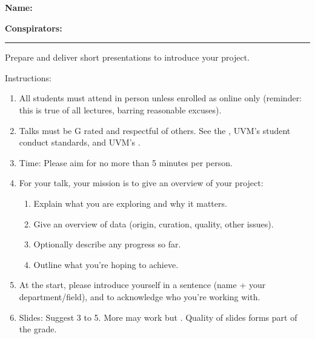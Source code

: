 \textbf{Name:} \\

\medskip

\textbf{Conspirators:} 

\medskip
\medskip

\hrule

\medskip


\assignmentsonly{\pleasesubmitprojectdraft}

Prepare and deliver short presentations to introduce your project.

Instructions:

\begin{enumerate}
\item 
  All students must attend in person unless enrolled as online only
  (reminder: this is true of all lectures, barring reasonable excuses).
  
\item 
  Talks must be G rated and respectful of others.
  See the
  ,
  UVM's student conduct standards,
  and UVM's
  .

\item
  Time: Please aim for no more than 5 minutes per person.

\item
  For your talk, your mission is to
  give an overview of your project:
  \begin{enumerate}
  \item
    Explain what you are exploring and why it matters.
  \item
    Give an overview of data (origin, curation, quality, other issues).
  \item
    Optionally describe any progress so far.
  \item
    Outline what you're hoping to achieve.
  \end{enumerate}

\item
  At the start, please introduce yourself in a sentence (name + your department/field),
  and to acknowledge who you're working with.

\item
  Slides: Suggest 3 to 5.  More may work but
  .
  Quality of slides forms part of the grade.


\end{enumerate}
